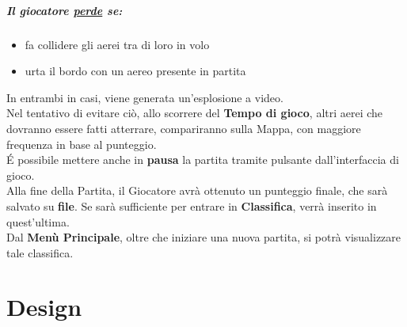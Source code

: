 \documentclass[a4paper,12pt]{report}
\begin{document}
\paragraph{Il giocatore \underline{perde} se:}
\begin{itemize}
    \item fa collidere gli aerei tra di loro in volo
    \item urta il bordo con un aereo presente in partita
\end{itemize}
In entrambi in casi, viene generata un'esplosione a video.
\\
Nel tentativo di evitare ciò, allo scorrere del \textbf{Tempo di gioco}, altri aerei che dovranno essere fatti atterrare, compariranno sulla Mappa, con maggiore frequenza in base al punteggio.
\\
É possibile mettere anche in \textbf{pausa} la partita tramite pulsante dall’interfaccia di gioco.
\\
Alla fine della Partita, il Giocatore avrà ottenuto un punteggio finale, che sarà salvato su \textbf{file}. Se sarà sufficiente per entrare in \textbf{Classifica}, verrà inserito in quest’ultima.
\\
Dal \textbf{Menù Principale}, oltre che iniziare una nuova partita, si potrà visualizzare tale classifica.

\chapter{Design}

\end{document}
